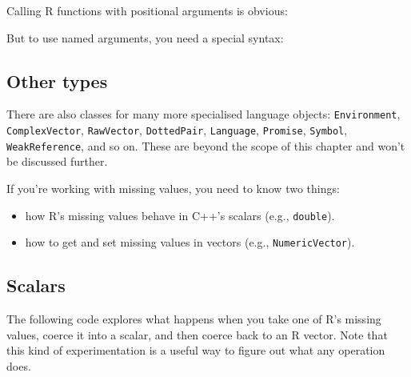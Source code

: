 Calling R functions with positional arguments is obvious:

\begin{Shaded}
\begin{Highlighting}[]
\NormalTok{, }\NormalTok{);}
\end{Highlighting}
\end{Shaded}

But to use named arguments, you need a special syntax:

\begin{Shaded}
\begin{Highlighting}[]
\NormalTok{f(_[}\NormalTok{] = }\NormalTok{, _[}\NormalTok{] = }\NormalTok{);}
\end{Highlighting}
\end{Shaded}

\subsection{Other types}

There are also classes for many more specialised language objects:
\texttt{Environment}, \texttt{ComplexVector}, \texttt{RawVector},
\texttt{DottedPair}, \texttt{Language}, \texttt{Promise},
\texttt{Symbol}, \texttt{WeakReference}, and so on. These are beyond the
scope of this chapter and won't be discussed further.


If you're working with missing values, you need to know two things:

\begin{itemize}
\itemsep1pt\parskip0pt
\item
  how R's missing values behave in C++'s scalars (e.g.,
  \texttt{double}).
\item
  how to get and set missing values in vectors (e.g.,
  \texttt{NumericVector}).
\end{itemize}

\subsection{Scalars}

The following code explores what happens when you take one of R's
missing values, coerce it into a scalar, and then coerce back to an R
vector. Note that this kind of experimentation is a useful way to figure
out what any operation does.

